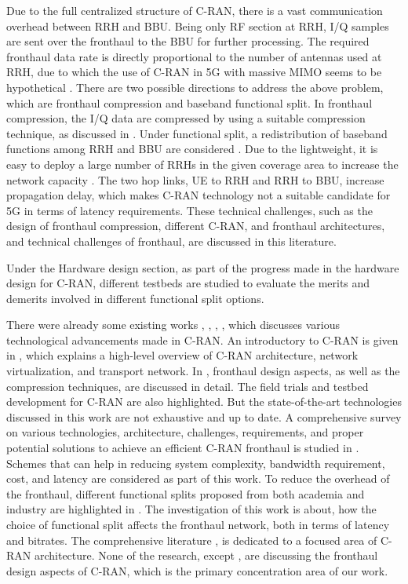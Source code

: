 \begin{multicols}{2}
Due to the full centralized structure of C-RAN, there is a vast communication overhead between RRH and BBU. Being only RF section at RRH, I/Q samples are sent over the fronthaul to the BBU for further processing. The required fronthaul data rate is directly proportional to the number of antennas used at RRH, due to which the use of C-RAN in 5G with massive MIMO seems to be hypothetical \cite{art3-key09}. There are two possible directions to address the above problem, which are fronthaul compression and baseband functional split. In fronthaul compression, the I/Q data are compressed by using a suitable compression technique, as discussed in \cite{art3-key10}. Under functional split, a redistribution of baseband functions among RRH and BBU are considered \cite{art3-key11}. Due to the lightweight, it is easy to deploy a large number of RRHs in the given coverage area to increase the network capacity \cite{art3-key05}. The two hop links, UE to RRH and RRH to BBU, increase propagation delay, which makes C-RAN technology not a suitable candidate for 5G in terms of latency requirements. These technical challenges, such as the design of fronthaul compression, different C-RAN, and fronthaul architectures, and technical challenges of fronthaul, are discussed in this literature.

Under the Hardware design section, as part of the progress made in the hardware design for C-RAN, different testbeds are studied to evaluate the merits and demerits involved in different functional split options.

There were already some existing works \cite{art3-key05}, \cite{art3-key07}, \cite{art3-key11}, \cite{art3-key12}, which discusses various technological advancements made in C-RAN. An introductory to C-RAN is given in \cite{art3-key05}, which explains a high-level overview of C-RAN architecture, network virtualization, and transport network. In \cite{art3-key07}, fronthaul design aspects, as well as the compression techniques, are discussed in detail. The field trials and testbed development for C-RAN are also highlighted. But the state-of-the-art technologies discussed in this work are not exhaustive and up to date. A comprehensive survey on various technologies, architecture, challenges, requirements, and proper potential solutions to achieve an efficient C-RAN fronthaul is studied in \cite{art3-key12}. Schemes that can help in reducing system complexity, bandwidth requirement, cost, and latency are considered as part of this work. To reduce the overhead of the fronthaul, different functional splits proposed from both academia and industry are highlighted in \cite{art3-key11}. The investigation of this work is about, how the choice of functional split affects the fronthaul network, both in terms of latency and bitrates. The comprehensive literature \cite{art3-key11}, \cite{art3-key12} is dedicated to a focused area of C-RAN architecture. None of the research, except \cite{art3-key07}, are discussing the fronthaul design aspects of C-RAN, which is the primary concentration area of our work.


\end{multicols}
